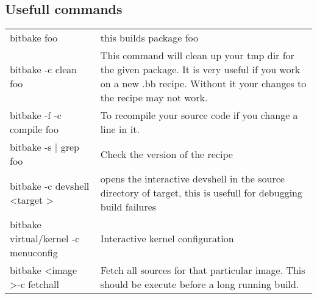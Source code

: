 \documentclass[10pt,a4paper,landscape]{article}
\begin{document}
\begin{multicols}{2}
\section{Usefull commands}
\begin{tabular}{p{5cm}p{\linewidth - 5.9cm}}
bitbake foo & this builds package foo \\
bitbake -c clean foo & This command will clean up your tmp dir for the given package. It is very useful if you work on a new .bb recipe. Without it your changes to the recipe may not work. \\
bitbake -f -c compile foo & To recompile your source code if you change a line in it. \\
bitbake -s | grep foo & Check the version of the recipe \\
bitbake -c devshell \textless target \textgreater &  opens the interactive devshell in the source directory of target, this is usefull for debugging build failures \\
bitbake virtual/kernel -c menuconfig & Interactive kernel configuration \\
bitbake \textless image \textgreater -c fetchall & Fetch all sources for that particular image. This should be execute before a long running build.


\end{tabular}


\end{multicols}
\end{document}
